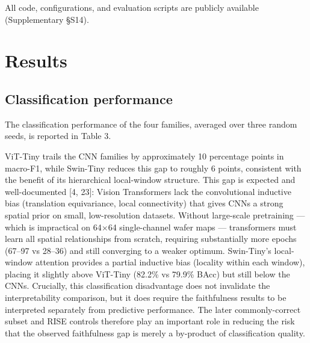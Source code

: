 \documentclass[11pt,a4paper]{article}
\begin{document}
All code, configurations, and evaluation scripts are publicly available (Supplementary \S{}S14).


\section{Results}

\subsection{Classification performance}

The classification performance of the four families, averaged over three random seeds, is reported in Table 3.

\begin{table}[htbp]
\centering
\small
\caption{\textbf{Table 3.} Classification performance (mean $\pm$ std across 3 seeds)}
\end{table}

ViT-Tiny trails the CNN families by approximately 10 percentage points in macro-F1, while Swin-Tiny reduces this gap to roughly 6 points, consistent with the benefit of its hierarchical local-window structure. This gap is expected and well-documented [4, 23]: Vision Transformers lack the convolutional inductive bias (translation equivariance, local connectivity) that gives CNNs a strong spatial prior on small, low-resolution datasets. Without large-scale pretraining --- which is impractical on 64$\times$64 single-channel wafer maps --- transformers must learn all spatial relationships from scratch, requiring substantially more epochs (67--97 vs 28--36) and still converging to a weaker optimum. Swin-Tiny's local-window attention provides a partial inductive bias (locality within each window), placing it slightly above ViT-Tiny (82.2\% vs 79.9\% BAcc) but still below the CNNs. Crucially,
this classification disadvantage does not invalidate the interpretability comparison, but it does require the faithfulness results to be interpreted separately from predictive performance. The later commonly-correct subset and RISE controls therefore play an important role in reducing the risk that the observed faithfulness gap is merely a by-product of classification quality.
\end{document}
